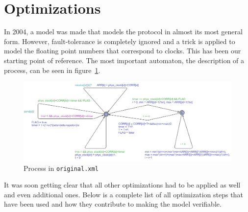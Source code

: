 \documentclass[a4paper,10pt]{article}
\begin{document}
\section{Optimizations}

In 2004, a model was made that models the protocol in almost its most general form. However, fault-tolerance is completely ignored and a trick is applied to model the floating point numbers that correspond to clocks. This has been our starting point of reference. The most important automaton, the description of a process, can be seen in figure~\ref{fig:original_process}.

\begin{figure}[!h]
\includegraphics[width=\textwidth]{original_process}
\caption{Process in \texttt{original.xml}\label{fig:original_process}}
\end{figure}

It was soon getting clear that all other optimizations had to be applied as well and even additional ones. Below is a complete list of all optimization steps that have been used and how they contribute to making the model verifiable.
\end{document}
